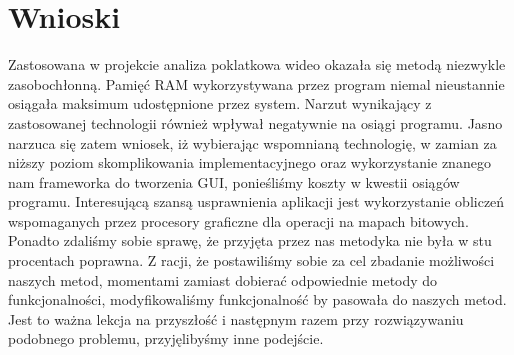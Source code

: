 \documentclass[a4paper]{article}
\begin{document}
\section{Wnioski}
Zastosowana w projekcie analiza poklatkowa wideo okazała się metodą niezwykle zasobochłonną. Pamięć RAM wykorzystywana przez program niemal nieustannie osiągała maksimum udostępnione przez system. Narzut wynikający z zastosowanej technologii również wpływał negatywnie na osiągi programu. Jasno narzuca się zatem wniosek, iż wybierając wspomnianą technologię, w zamian za niższy poziom skomplikowania implementacyjnego oraz wykorzystanie znanego nam frameworka do tworzenia GUI, ponieśliśmy koszty w kwestii osiągów programu. Interesującą szansą usprawnienia aplikacji jest wykorzystanie obliczeń wspomaganych przez procesory graficzne dla operacji na mapach bitowych.\\
Ponadto zdaliśmy sobie sprawę, że przyjęta przez nas metodyka nie była w stu procentach poprawna. Z racji, że postawiliśmy sobie za cel zbadanie możliwości naszych metod, momentami zamiast dobierać odpowiednie metody do funkcjonalności, modyfikowaliśmy funkcjonalność by pasowała do naszych metod. Jest to ważna lekcja na przyszłość i następnym razem przy rozwiązywaniu podobnego problemu, przyjęlibyśmy inne podejście.

\newpage
\printbibliography
\end{document}
